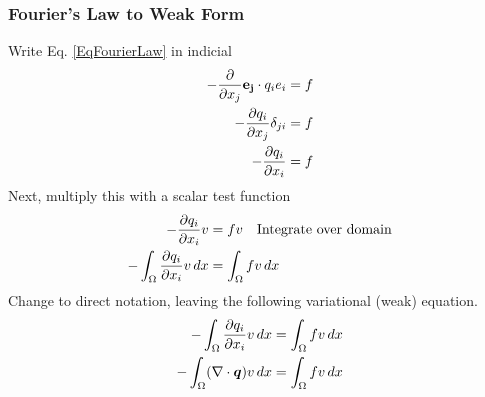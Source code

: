 \documentclass[12pt,3p]{article}
\begin{document}
\subsubsection{Fourier's Law to Weak Form}
Write Eq. \ref{EqFourierLaw} in indicial 
\begin{align*}
-\pdv{}{x_j} \mathbf{e_j} \cdot q_i e_i &= f \\
-\pdv{q_i}{x_j} \delta_{ji} &= f \\
-\pdv{q_i}{x_i}  &= f
\end{align*}
Next, multiply this with a scalar test function 
\begin{align*}
-\pdv{q_i}{x_i} v &= f v  \quad \text{Integrate over domain}\\
- \int_{\Omega} \pdv{q_i}{x_i} v \, d x &= \int_{\Omega} f v \, dx 
\end{align*}
Change to direct notation, leaving the following variational (weak) equation. 
\begin{subequations}\label{EqWeakForm2}
\begin{align}
- \int_{\Omega} \pdv{q_i}{x_i} v \, d x &= \int_{\Omega} f v \, dx \\
- \int_{\Omega} (\nabla \cdot \bm{q}) v \, dx &=  \int_{\Omega} f v \, dx
\end{align}
\end{subequations}

\end{document}
